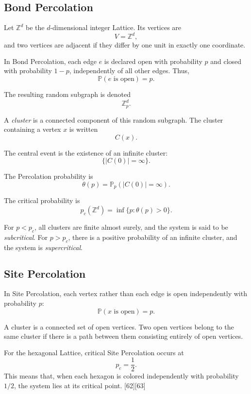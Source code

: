 \documentclass[a4paper, 10pt, onepage]{elegantbook}
\begin{document}
{\subsection{Bond Percolation}

Let \(\mathbb Z^d\) be the \(d\)-dimensional integer Lattice. Its vertices are
\[
V=\mathbb Z^d,
\]
and two vertices are adjacent if they differ by one unit in exactly one
coordinate.

In Bond Percolation, each edge \(e\) is declared open with probability \(p\)
and closed with probability \(1-p\), independently of all other edges. Thus,
\[
\mathbb P(e\text{ is open})=p.
\]

The resulting random subgraph is denoted
\[
\mathbb Z^d_p.
\]

A \emph{cluster} is a connected component of this random subgraph. The cluster
containing a vertex \(x\) is written
\[
C(x).
\]

The central event is the existence of an infinite cluster:
\[
\{|C(0)|=\infty\}.
\]

The Percolation probability is
\[
\theta(p)
=
\mathbb P_p(|C(0)|=\infty).
\]

The critical probability is
\[
p_c(\mathbb Z^d)
=
\inf\{p:\theta(p)>0\}.
\]

For \(p<p_c\), all clusters are finite almost surely, and the system is said to
be \emph{subcritical}. For \(p>p_c\), there is a positive probability of an
infinite cluster, and the system is \emph{supercritical}.

\subsection{Site Percolation}

In Site Percolation, each vertex rather than each edge is open independently
with probability \(p\):
\[
\mathbb P(x\text{ is open})=p.
\]

A cluster is a connected set of open vertices. Two open vertices belong to the
same cluster if there is a path between them consisting entirely of open
vertices.

For the hexagonal Lattice, critical Site Percolation occurs at
\[
p_c=\frac12.
\]
This means that, when each hexagon is colored independently with probability
\(1/2\), the system lies at its critical point. [62][63]

}
\end{document}
